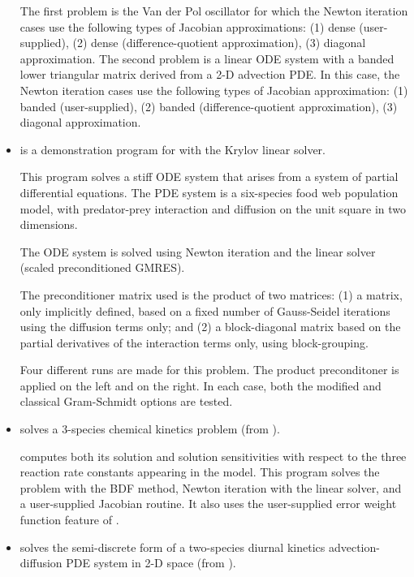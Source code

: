\begin{itemize}
  The first problem is the Van der Pol oscillator for which 
  the Newton iteration cases use the following types of Jacobian approximations:
  (1) dense (user-supplied), (2) dense (difference-quotient approximation), 
  (3) diagonal approximation. The second problem is a linear ODE system with a
  banded lower triangular matrix derived from a 2-D advection PDE. In this
  case, the Newton iteration cases use the following types of Jacobian
  approximation: (1) banded (user-supplied), (2) banded (difference-quotient
  approximation), (3) diagonal approximation.

\item {}
  is a demonstration program for {\cvodes} with the Krylov linear solver.

  This program solves a stiff ODE system that arises from a system     
  of partial differential equations.  The PDE system is a six-species
  food web population model, with predator-prey interaction and diffusion 
  on the unit square in two dimensions.

  The ODE system is solved using Newton iteration and the      
  {\cvspgmr} linear solver (scaled preconditioned GMRES).

  The preconditioner matrix used is the product of two matrices:         
  (1) a matrix, only implicitly defined, based on a fixed number of     
  Gauss-Seidel iterations using the diffusion terms only; and               
  (2) a block-diagonal matrix based on the partial derivatives of the   
  interaction terms only, using block-grouping.                          

  Four different runs are made for this problem.                        
  The product preconditoner is applied on the left and on the right.    
  In each case, both the modified and classical Gram-Schmidt options    
  are tested.

\item {}
  solves a 3-species chemical kinetics problem (from ).

  {\cvodes} computes both its solution and solution sensitivities with respect
  to the three reaction rate constants appearing in the model. 
  This program solves the problem with the BDF method, Newton          
  iteration with the {\cvdense} linear solver, and a user-supplied    
  Jacobian routine. It also uses the user-supplied error
  weight function feature of {\cvodes}.

\item {}
  solves the semi-discrete form of a two-species diurnal kinetics
  advection-diffusion PDE system in 2-D space (from ).


\end{itemize}
